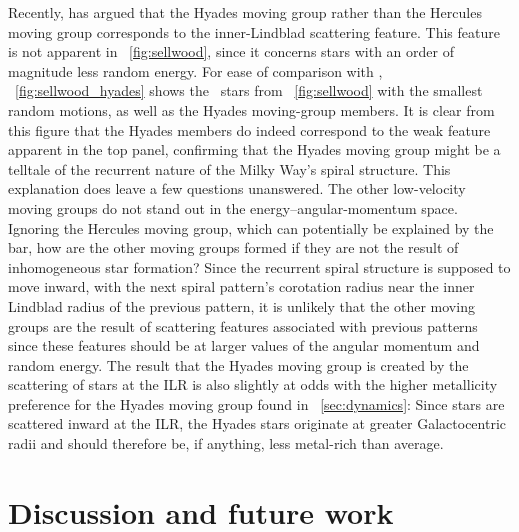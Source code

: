 Recently, \citet{sellwood10a} has argued that the Hyades moving group
rather than the Hercules moving group corresponds to the
inner-Lindblad scattering feature. This feature is not apparent in
\figurename~\ref{fig:sellwood}, since it concerns stars with an order
of magnitude less random energy. For ease of comparison with
\citet{sellwood10a}, \figurename~\ref{fig:sellwood_hyades} shows the
\gcsabb\ stars from \figurename~\ref{fig:sellwood} with the smallest
random motions, as well as the Hyades moving-group members. It is
clear from this figure that the Hyades members do indeed correspond to
the weak feature apparent in the top panel, confirming that the Hyades
moving group might be a telltale of the recurrent nature of the Milky
Way's spiral structure. This explanation does leave a few questions
unanswered. The other low-velocity moving groups do not stand out in
the energy--angular-momentum space. Ignoring the Hercules moving
group, which can potentially be explained by the bar, how are the
other moving groups formed if they are not the result of inhomogeneous
star formation? Since the recurrent spiral structure is supposed to
move inward, with the next spiral pattern's corotation radius near the
inner Lindblad radius of the previous pattern, it is unlikely that the
other moving groups are the result of scattering features associated
with previous patterns since these features should be at larger values
of the angular momentum and random energy. The result that the Hyades
moving group is created by the scattering of stars at the ILR is also
slightly at odds with the higher metallicity preference for the Hyades
moving group found in \sectionname~\ref{sec:dynamics}: Since stars are
scattered inward at the ILR, the Hyades stars originate at greater
Galactocentric radii and should therefore be, if anything, less
metal-rich than average.



\section{Discussion and future work}\label{sec:discussion}

